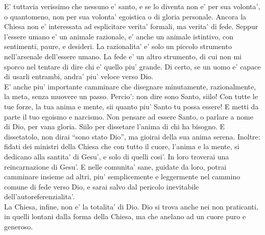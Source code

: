 E' tuttavia verissimo che nessuno e' santo,
e se lo diventa non e' per sua volonta',
o quantomeno, non per sua volonta' egoistica o 
di gloria personale.
Ancora la Chiesa non e' interessata ad esplicitare
verita' formali, ma verita' di fede. Seppur l'essere umano e' un animale razionale, e' anche un animale istintivo, con sentimenti, paure, e desideri. La razionalita' e' solo un piccolo strumento nell'arsenale dell'essere umano. La fede e' un altro strumento, di cui non mi sporco nel tentare di dire chi e' quello piu' grande. Di certo, se un uomo e' capace di usarli entrambi, andra' piu' veloce verso Dio.\\
E' anche piu' importante camminare che disegnare 
minutamente, razionalmente, la meta, senza muovere un passo.
Percio': non dire sono Santo, siilo! 
Con tutte le tue forze, la tua anima e mente, sii 
quanto piu' Santo tu possa essere! E metti
da parte il tuo egoismo e narcismo.
Non pensare ad essere Santo, o parlare a nome di Dio,
per vana gloria. Siilo per dissetare l'anima 
di chi ha bisogno. E dissetatolo, 
non dirai ``sono stato Dio'', ma 
gioirai della sua anima serena.
Inoltre: fidati dei ministri della Chiesa che con tutto
il cuore, l'anima e la mente, si dedicano alla santita'
di Gesu', e solo di quelli cosi'.
In loro troverai una reincarnazione di Gesu'.
E nelle comunita' sane, guidate da loro, potrai 
camminare insieme ad altri, piu' semplicemente e
leggermente nel cammino comune di fede verso Dio,
e sarai salvo dal pericolo inevitabile 
dell'autoreferenzialita'.\\
La Chiesa, infine, non e' la totalita' di Dio. Dio si trova anche nei non praticanti, in quelli lontani dalla forma della Chiesa, ma che anelano ad un cuore puro e generoso.

